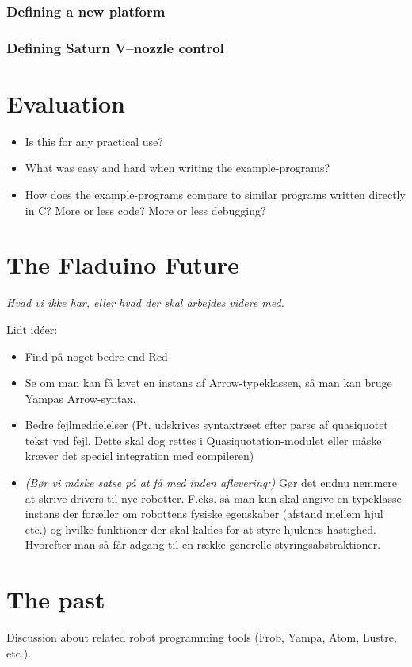 \documentclass[a4paper, oneside, final]{memoir}
\begin{document}
\subsection{Defining a new platform}

\subsection{Defining Saturn V--nozzle control}

\chapter{Evaluation}
\begin{itemize}
\item Is this for any practical use?
\item What was easy and hard when writing the example-programs?
\item How does the example-programs compare to similar programs
  written directly in C? More or less code? More or less debugging?
\end{itemize}

\chapter{The Fladuino Future}
\textit{Hvad vi ikke har, eller hvad der skal arbejdes videre med. }

Lidt idéer:
\begin{itemize}
\item Find på noget bedre end Red 
\item Se om man kan få lavet en instans af Arrow-typeklassen, så man
  kan bruge Yampas Arrow-syntax.
\item Bedre fejlmeddelelser (Pt. udskrives syntaxtræet efter parse af
  quasiquotet tekst ved fejl. Dette skal dog rettes i
  Quasiquotation-modulet eller måske kræver det speciel integration
  med compileren)
\item \textit{(Bør vi måske satse på at få med inden aflevering:)}
  Gør det endnu nemmere at skrive drivers til nye
  robotter. F.eks. så man kun skal angive en typeklasse instans der
  foræller om robottens fysiske egenskaber (afstand mellem hjul etc.)
  og hvilke funktioner der skal kaldes for at styre hjulenes
  hastighed. Hvorefter man så får adgang til en række generelle
  styringsabstraktioner.
\end{itemize}

\chapter{The past}
Discussion about related robot programming tools (Frob, Yampa, Atom,
Lustre, etc.).
\end{document}
